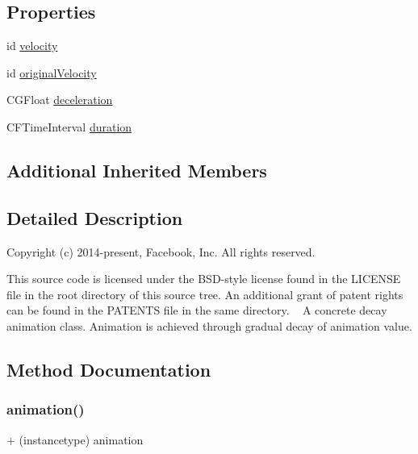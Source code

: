 \subsection*{Properties}
\begin{DoxyCompactItemize}
\item 
id \mbox{\hyperlink{interface_p_o_p_decay_animation_a73bb560f604b2c19ee9f310d9b2a93d3}{velocity}}
\item 
id \mbox{\hyperlink{interface_p_o_p_decay_animation_ac9d78da988c9de19ab8777edfa52a315}{original\+Velocity}}
\item 
C\+G\+Float \mbox{\hyperlink{interface_p_o_p_decay_animation_a9656554d08e5936f9a37380c6560b180}{deceleration}}
\item 
C\+F\+Time\+Interval \mbox{\hyperlink{interface_p_o_p_decay_animation_a86bbccef9809d72daa6190fa8cab465f}{duration}}
\end{DoxyCompactItemize}
\subsection*{Additional Inherited Members}


\subsection{Detailed Description}
Copyright (c) 2014-\/present, Facebook, Inc. All rights reserved.

This source code is licensed under the B\+S\+D-\/style license found in the L\+I\+C\+E\+N\+SE file in the root directory of this source tree. An additional grant of patent rights can be found in the P\+A\+T\+E\+N\+TS file in the same directory. ~\newline
 A concrete decay animation class.  Animation is achieved through gradual decay of animation value. 

\subsection{Method Documentation}
\mbox{\label{interface_p_o_p_decay_animation_ada86965ca405f665e5e0ac41a2175e28}} 
\subsubsection{\texorpdfstring{animation()}{animation()}\hspace{0.1cm}{\footnotesize\ttfamily [1/3]}}
{\footnotesize\ttfamily + (instancetype) animation \begin{DoxyParamCaption}{ }\end{DoxyParamCaption}}

